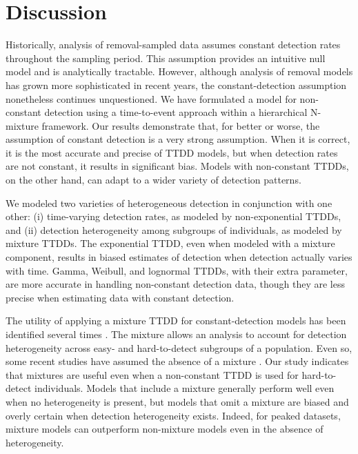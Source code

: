 \documentclass[useAMS,usenatbib,referee,12pt]{article}
\begin{document}
\section{Discussion} \label{sec:discuss}

Historically, analysis of removal-sampled data assumes constant detection rates throughout the sampling period.  
This assumption provides an intuitive null model and is analytically tractable.  
However, although analysis of removal models has grown more sophisticated in recent years, the constant-detection assumption nonetheless continues unquestioned.  
We have formulated a model for non-constant detection using a time-to-event approach within a hierarchical N-mixture framework.  
Our results demonstrate that, for better or worse, the assumption of constant detection is a very strong assumption.  
When it is correct, it is the most accurate and precise of TTDD models, but when detection rates are not constant, it results in significant bias.  
Models with non-constant TTDDs, on the other hand, can adapt to a wider variety of detection patterns.

We modeled two varieties of heterogeneous detection in conjunction with one other: (i) time-varying detection rates, as modeled by non-exponential TTDDs, and (ii) detection heterogeneity among subgroups of individuals, as modeled by mixture TTDDs.  
The exponential TTDD, even when modeled with a mixture component, results in biased estimates of detection when detection actually varies with time.  
Gamma, Weibull, and lognormal TTDDs, with their extra parameter, are more accurate in handling non-constant detection data, though they are less precise when estimating data with constant detection.

The utility of applying a mixture TTDD for constant-detection models has been identified several times \citep{Pledger2000, Farnsworth2002, Alldredge2007, Reidy2011}.  
The mixture allows an analysis to account for detection heterogeneity across easy- and hard-to-detect subgroups of a population.  
Even so, some recent studies have assumed the absence of a mixture \citep{Solymos2013, Amundson2014}.  
Our study indicates that mixtures are useful even when a non-constant TTDD is used for hard-to-detect individuals.  
Models that include a mixture generally perform well even when no heterogeneity is present, but models that omit a mixture are biased and overly certain when detection heterogeneity exists.  
Indeed, for peaked datasets, mixture models can outperform non-mixture models even in the absence of heterogeneity.
\end{document}
